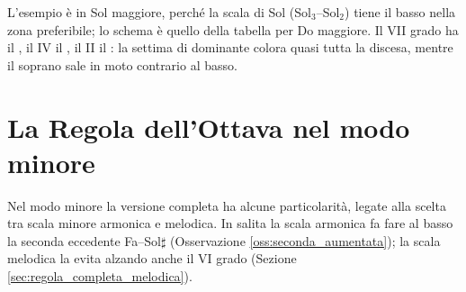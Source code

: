 \begin{esempio}
	\label{ex:regola_completa_disc_magg}
	L'esempio è in Sol maggiore, perché la scala di Sol (Sol$_3$--Sol$_2$) tiene il basso nella zona preferibile; lo schema è quello della tabella per Do maggiore. Il VII grado ha il , il IV il , il II il : la settima di dominante colora quasi tutta la discesa, mentre il soprano sale in moto contrario al basso.
\end{esempio}

\section{La Regola dell'Ottava nel modo minore}
\label{sec:regola_completa_minore}

Nel modo minore la versione completa ha alcune particolarità, legate alla scelta tra scala minore armonica e melodica. In salita la scala armonica fa fare al basso la seconda eccedente Fa--Sol$\sharp$ (Osservazione \ref{oss:seconda_aumentata}); la scala melodica la evita alzando anche il VI grado (Sezione \ref{sec:regola_completa_melodica}).

